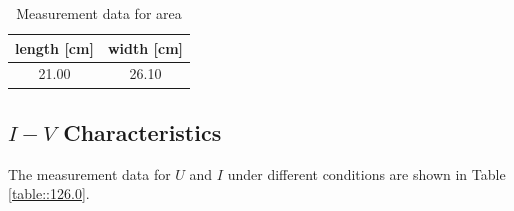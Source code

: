 \documentclass[a4paper]{article}
\begin{document}
\begin{table}[H]
	\centering
	\begin{tabular}{cc}
		\hline
		length [cm] & width [cm] \\ \hline
		21.00       & 26.10      \\ \hline
	\end{tabular}
	\caption{Measurement data for area}
	\label{table::area}
\end{table}

\subsection{$I-V$ Characteristics}

The measurement data for $U$ and $I$ under different conditions are shown in Table \ref{table::126.0}.
\end{document}
